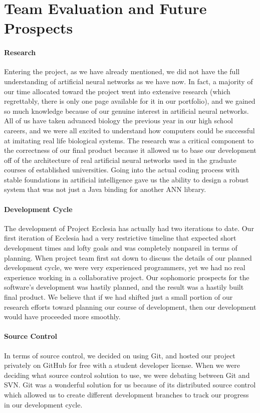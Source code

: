 \documentclass[letterpaper, 10pt]{article}
\begin{document}
\cleardoublepage		
\section{Team Evaluation and Future Prospects}
	\paragraph{Research}
	Entering the project, as we have already mentioned, we did not have the full understanding of artificial neural networks as we have now. In fact, a majority of our time allocated toward the project went into extensive research (which regrettably, there is only one page available for it in our portfolio), and we gained so much knowledge because of our genuine interest in artificial neural networks. All of us have taken advanced biology the previous year in our high school careers, and we were all excited to understand how computers could be successful at imitating real life biological systems. The research was a critical component to the correctness of our final product because it allowed us to base our development off of the architecture of real artificial neural networks used in the graduate courses of established universities. Going into the actual coding process with stable foundations in artificial intelligence gave us the ability to design a robust system that was not just a Java binding for another ANN library.

	\paragraph{Development Cycle}
	The development of Project Ecclesia has actually had two iterations to date. Our first iteration of Ecclesia had a very restrictive timeline that expected short development times and lofty goals and was completely nonpareil in terms of planning. When project team first sat down to discuss the details of our planned development cycle, we were very experienced programmers, yet we had no real experience working in a collaborative project. Our sophomoric prospects for the software's development was hastily planned, and the result was a hastily built final product. We believe that if we had shifted just a small portion of our research efforts toward planning our course of development, then our development would have proceeded more smoothly.
	
	\paragraph{Source Control}
	In terms of source control, we decided on using Git, and hosted our project privately on GitHub for free with a student developer license. When we were deciding what source control solution to use, we were debating between Git and SVN. Git was a wonderful solution for us because of its distributed source control which allowed us to create different development branches to track our progress in our development cycle.
	
\end{document}
